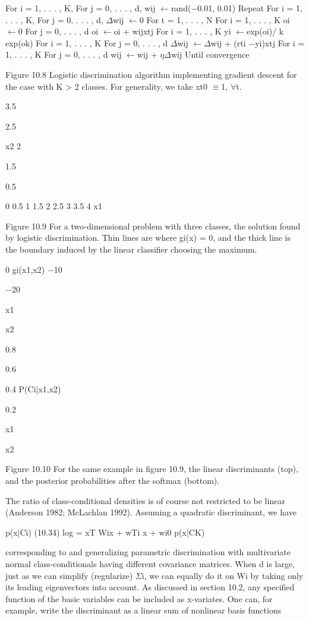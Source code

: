 For i = 1, . . . , K, For j = 0, . . . , d, wij $\leftarrow$rand($-$0.01, 0.01) Repeat For i = 1, . . . , K, For j = 0, . . . , d, $\Delta$wij $\leftarrow$0 For t = 1, . . . , N For i = 1, . . . , K oi $\leftarrow$0 For j = 0, . . . , d oi $\leftarrow$oi + wijxtj For i = 1, . . . , K yi $\leftarrow$exp(oi)/ k exp(ok) For i = 1, . . . , K For j = 0, . . . , d $\Delta$wij $\leftarrow$$\Delta$wij + (rti $-$yi)xtj For i = 1, . . . , K For j = 0, . . . , d wij $\leftarrow$wij + $\eta$$\Delta$wij Until convergence

Figure 10.8 Logistic discrimination algorithm implementing gradient descent for the case with K > 2 classes. For generality, we take xt0 $\equiv$1, $\forall$t.

3.5

2.5

x2 2

1.5

0.5

0 0.5 1 1.5 2 2.5 3 3.5 4 x1

Figure 10.9 For a two-dimensional problem with three classes, the solution found by logistic discrimination. Thin lines are where gi(x) = 0, and the thick line is the boundary induced by the linear classifier choosing the maximum.

0 gi(x1,x2) $-$10

$-$20

x1

x2

0.8

0.6

0.4 P(Ci|x1,x2)

0.2

x1

x2

Figure 10.10 For the same example in figure 10.9, the linear discriminants (top), and the posterior probabilities after the softmax (bottom).

The ratio of class-conditional densities is of course not restricted to be linear (Anderson 1982; McLachlan 1992). Assuming a quadratic discriminant, we have

p(x|Ci) (10.34) log = xT Wix + wTi x + wi0 p(x|CK)

corresponding to and generalizing parametric discrimination with multivariate normal class-conditionals having different covariance matrices. When d is large, just as we can simplify (regularize) $\Sigma$i, we can equally do it on Wi by taking only its leading eigenvectors into account. As discussed in section 10.2, any specified function of the basic variables can be included as x-variates. One can, for example, write the discriminant as a linear sum of nonlinear basis functions

